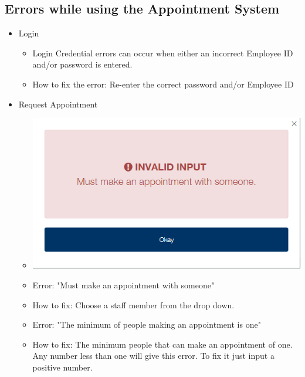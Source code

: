 \subsection{Errors while using the Appointment System}
	\begin{itemize}
		\item Login
			\begin{itemize}
				\item Login Credential errors can occur when either an incorrect Employee ID  and/or password is entered. 
				\item How to fix the error: Re-enter the correct password and/or Employee ID
			\end{itemize}
		\item Request Appointment
			\begin{itemize}
				\item \includegraphics[width=\linewidth]{images/Screenshots/Errors/NotLoggedIn/With.png}
				\item Error: "Must make an appointment with someone"
				\item How to fix: Choose a staff member from the drop down.
				
				
				\item Error: "The minimum of people making an appointment is one"
				\item How to fix: The minimum people that can make an appointment of one. Any number less than one will give this error. To fix it just input a positive number. 
				

\end{itemize}
\end{itemize}
